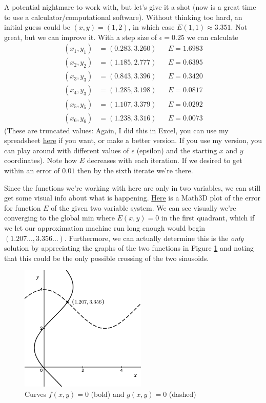 \documentclass[12pt]{article}
\numberwithin{equation}{subsection}
\numberwithin{figure}{subsection}
\theoremstyle{note}
\begin{document}
{A potential nightmare to work with, but let's give it a shot (now is a great time to use a calculator/computational software). Without thinking too hard, an initial guess could be $(x,y)=(1,2)$, in which case $E(1,1)\approx 3.351
$. Not great, but we can improve it. With a step size of $\epsilon =0.25$ we can calculate \begin{align*} 
(x_1,y_1)&=( 0.283,	3.260) && E= 1.6983 \\
(x_2,y_2)&= (1.185,	2.777) && E=0.6395 \\
(x_3,y_3)&=(0.843,	3.396) && E= 0.3420 \\ 
 (x_4,y_3)&=(1.285,	3.198) && E= 0.0817\\
(x_5,y_5)&=(1.107,	3.379) && E=0.0292\\
(x_6,y_6)&=(1.238,	3.316) &&E= 0.0073
\end{align*}
(These are truncated values: Again, I did this in Excel, you can use my spreadsheet \href{https://msoe.box.com/s/lkjin287s0ahd7dnecyb7t3pefqzrf0d}{here} if you want, or make a better version. If you use my version, you can play around with different values of $\epsilon$ (epsilon) and the starting $x$ and $y$ coordinates). Note how $E$ decreases with each iteration. If we desired to get within an error of $0.01$ then by the sixth iterate we're there. 


Since the functions we're working with here are only in two variables, we can still get some visual info about what is happening. \href{https://www.math3d.org/4J9C11cPD}{Here} is a Math3D plot of the error for function $E$ of the given two variable system. We can see visually we're converging to the global min where $E(x,y)=0$ in the first quadrant, which if we let our approximation machine run long enough would begin $(1.207...,3.356...)$. Furthermore, we can actually determine this is the \textit{only} solution by appreciating the graphs of the two functions  in Figure \ref{fig-grad-curves} and noting that this could be the only possible crossing of the two sinusoids.

\begin{figure}[h!]
\centering 
\includegraphics[width=60mm]{Images/ws14-sol-2}
\caption{Curves $f(x,y)=0$ (bold) and $g(x,y)=0$ (dashed)}
\label{fig-grad-curves}
\end{figure}


}
\end{document}
